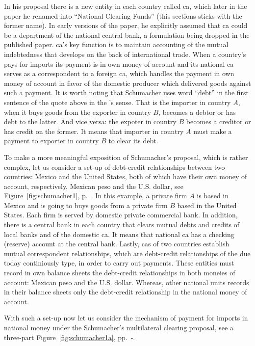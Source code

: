 In his proposal there is a new entity in each country called \acf{ca}, which later in the paper he renamed into ``National Clearing Funds'' (this sections sticks with the former name). In early versions of the paper, he explicitly assumed that \ac{ca} could be a department of the national central bank, a formulation being dropped in the published paper. \ac{ca}'s key function is to maintain accounting of the mutual indebtedness that develops on the back of international trade. When a country's pays for imports its payment is in own money of account and its national \ac{ca} serves as a correspondent to a foreign \ac{ca}, which handles the payment in own money of account in favor of the domestic producer which delivered goods against such a payment. It is worth noting that Schumacher uses word ``debt'' in the first sentence of the quote above in the \citeauthor{innes1913}'s sense. That is the importer in country $A$, when it buys goods from the exporter in country $B$, becomes a debtor or has debt to the latter. And vice versa: the expoter in country $B$ becomes a creditor or has credit on the former. It means that importer in country $A$ must make a payment to exporter in country $B$ to clear its debt. 

To make a more meaningful exposition of Schumacher's proposal, which is rather complex, let us consider a set-up of debt-credit relationships between two countries: Mexico and the United States, both of which have their own money of account, respectively, Mexican peso and the U.S. dollar, see Figure~\ref{fig:schumacher1}, p.~\pageref{fig:schumacher1}. In this example, a private firm $A$ is based in Mexico and is going to buys goods from a private firm $B$ based in the United States. Each firm is served by domestic private commercial bank. In addition, there is a central bank in each country that clears mutual debts and credits of local banks and of the domestic \acf{ca}. It means that national \ac{ca} has a checking (reserve) account at the central bank. Lastly, \acp{ca} of two countries establish mutual correspondent relationships, which are debt-credit relationships of the due today continiously type, in order to carry out payments. These entities must record in own balance sheets the debt-credit relationships in both moneies of account: Mexican peso and the U.S. dollar. Whereas, other national units records in their balance sheets only the debt-credit relationship in the national money of account.

With such a set-up now let us consider the mechanism of payment for imports in national money under the Schumacher's multilateral clearing proposal, see a three-part Figure~\ref{fig:schumacher1a}, pp.~\pageref{fig:schumacher1a}-\pageref{fig:schumacher1c}. 

